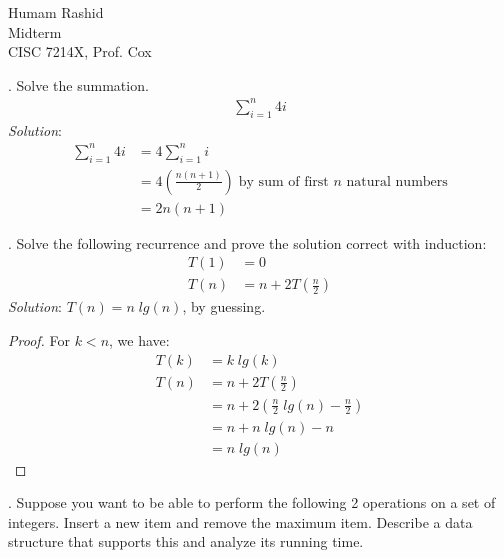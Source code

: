 \documentclass{scrartcl}
\begin{document}
\begin{flushleft}
    Humam Rashid\\
    Midterm\\
    CISC 7214X, Prof. Cox\\
\end{flushleft}
    \bigskip
    
    . Solve the summation.
    \begin{align*}
        \sum_{i=1}^{n} 4i
    \end{align*}
    \textit{Solution}:
    \begin{align*}
        \sum_{i=1}^{n} 4i &= 4 \sum_{i=1}^{n} i\\
                          &= 4 (\frac{n (n + 1)}{2})\;\text{by sum of first $n$ natural numbers}\\
                          &= 2n(n + 1)
    \end{align*}

    . Solve the following recurrence and prove the solution correct with induction:
    \begin{align*}
        T(1) &= 0\\
        T(n) &= n + 2 T(\frac{n}{2})
    \end{align*}
    \textit{Solution}: $T(n) = n\;lg(n)$, by guessing.
    \medskip
    \begin{proof}
        For $k < n$, we have:\\
        \begin{align*}
            T(k) &= k\;lg(k)\\
            T(n) &= n + 2 T(\frac{n}{2})\\
                 &= n + 2 (\frac{n}{2}\;lg(n) - \frac{n}{2})\\
                 &= n + n\;lg(n) - n\\
                 &= n\;lg(n)
        \end{align*}
    \end{proof}
    . Suppose you want to be able to perform the following 2 operations on a set of integers.
    Insert a new item and remove the maximum item. Describe a data structure that supports this and
    analyze its running time.\\
\end{document}
